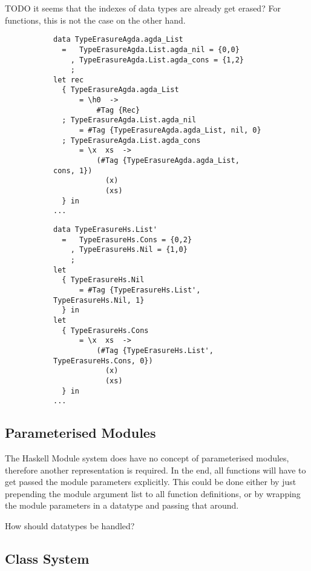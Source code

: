 \documentclass[12pt, a4paper, twoside]{report}
\begin{document}
TODO it seems that the indexes of data types are already get erased?
For functions, this is not the case on the other hand.
\begin{landscape}
\begin{figure}
\begin{subfigure}[b]{0.5\linewidth}

\begin{lstlisting}
data TypeErasureAgda.agda_List
  =   TypeErasureAgda.List.agda_nil = {0,0}
    , TypeErasureAgda.List.agda_cons = {1,2}
    ;
let rec
  { TypeErasureAgda.agda_List
      = \h0  ->
          #Tag {Rec}
  ; TypeErasureAgda.List.agda_nil
      = #Tag {TypeErasureAgda.agda_List, nil, 0}
  ; TypeErasureAgda.List.agda_cons
      = \x  xs  ->
          (#Tag {TypeErasureAgda.agda_List, cons, 1})
            (x)
            (xs)
  } in
...
\end{lstlisting}
\end{subfigure}
\begin{subfigure}[b]{0.5\linewidth}

\begin{lstlisting}
data TypeErasureHs.List'
  =   TypeErasureHs.Cons = {0,2}
    , TypeErasureHs.Nil = {1,0}
    ;
let
  { TypeErasureHs.Nil
      = #Tag {TypeErasureHs.List', TypeErasureHs.Nil, 1}
  } in
let
  { TypeErasureHs.Cons
      = \x  xs  ->
          (#Tag {TypeErasureHs.List', TypeErasureHs.Cons, 0})
            (x)
            (xs)
  } in
...
\end{lstlisting}
\end{subfigure}
\end{figure}
\end{landscape}

\subsection{Parameterised Modules}
The Haskell Module system does have no concept of parameterised modules, therefore another representation is required. In the end,
all functions will have to get passed the module parameters explicitly. This could be done either by just prepending the module
argument list to all function definitions, or by wrapping the module parameters in a datatype and passing that around.

How should datatypes be handled?

\subsection{Class System}
\end{document}
